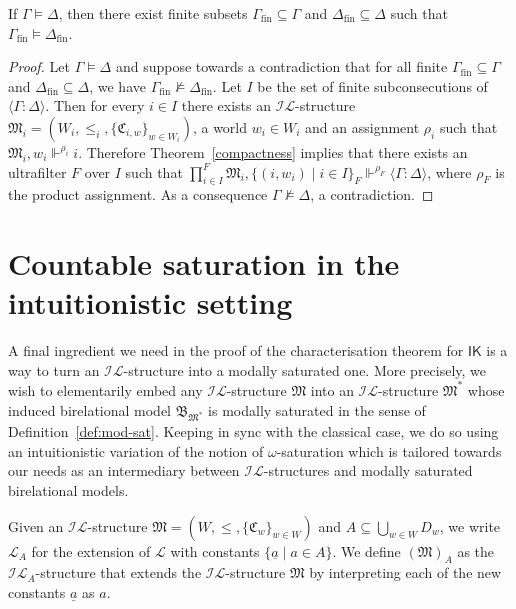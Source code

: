 \documentclass[submission,copyright,creativecommons]{eptcs}
\newcommand{\mo}{\mathfrak}
\newcommand{\B}{\mo{B}}
\newcommand{\finset}{_\mathrm{fin}}
\newcommand{\und}{\underline}
\newcommand{\IL}{\mathscr{I\!\!L}}   %
\newcommand{\LL}{\mathcal{L}}        %
\newcommand{\IK}{\mathsf{IK}}
\newcommand{\consec}[2]{\langle #1:#2 \rangle}
\newcommand{\satisfySym}{\Vdash}
\newcommand{\satisfy}[4]{#1, #2 \satisfySym^{#4} #3}
\begin{document}
\begin{corollary}\label{cor.compactness}
  If $\Gamma \models \Delta$, then there exist finite subsets
  $\Gamma\finset \subseteq \Gamma$ and $\Delta\finset \subseteq \Delta$
  such that $\Gamma\finset\models \Delta\finset$.
\end{corollary}
\begin{proof}
  Let $\Gamma \models \Delta$ and suppose towards a contradiction that for all
  finite $\Gamma\finset \subseteq \Gamma$ and $\Delta\finset \subseteq \Delta$,
  we have $\Gamma\finset \not\models \Delta\finset$.
  Let $I$ be the set of finite subconsecutions of $\consec{\Gamma}{\Delta}$.
  Then for every $i \in I$ there exists an $\IL$-structure
  $\mo{M}_i = (W_i, \leq_i, \{ \mo{C}_{i,w} \}_{w \in W_i})$, a world $w_i \in W_i$ and an assignment $\rho_i$
  such that $\satisfy{\mo{M}_i}{w_i}{i}{\rho_i}$.
  Therefore Theorem~\ref{compactness} implies that there exists an
  ultrafilter $F$ over $I$ such that $\satisfy{\prod_{i \in I}^F \mo{M}_i}{\{(i,w_i) \mid i \in I\}_F}{\consec{\Gamma}{\Delta}}{\rho_F}$,
  where $\rho_F$ is the product assignment.
  As a consequence $\Gamma \not\models \Delta$, a contradiction.
\end{proof}



\section{Countable saturation in the intuitionistic setting}\label{sec:saturation}

  A final ingredient we need in the proof of the characterisation theorem for
  $\IK$ is a way to turn an $\IL$-structure into a modally saturated one.
  More precisely, we wish to elementarily embed any $\IL$-structure
  $\mo{M}$ into an $\IL$-structure $\mo{M}^*$ whose induced birelational
  model $\B_{\mo{M}^*}$ is modally saturated in the sense of
  Definition~\ref{def:mod-sat}.
%
  Keeping in sync with the classical case, we do so using an intuitionistic
  variation of the notion of $\omega$-saturation which is tailored towards
  our needs as an intermediary between $\IL$-structures and modally saturated
  birelational models.

\begin{definition}
  Given an $\IL$-structure $\mo{M} = (W, \leq, \{ \mo{C}_w \}_{w \in W})$
  and $A\subseteq\bigcup_{w\in W}D_w$,
  we write $\LL_A$ for the extension of $\LL$ with constants
  $\{ \und{a} \mid a \in A \}$. We define $(\mo{M})_A$ as the $\IL_A$-structure that extends the $\IL$-structure $\mo{M}$ by interpreting
  each of the new constants $\und{a}$ as $a$.
\end{definition}
\end{document}
